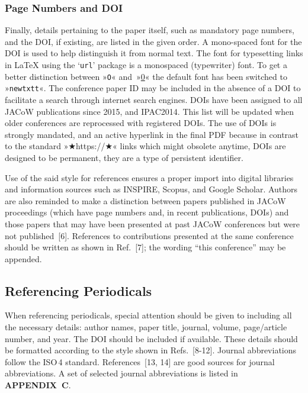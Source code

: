 \documentclass[%
               hyphens,       %
               ]{jacow}
\begin{document}
\subsubsection{Page Numbers and DOI}

Finally, details pertaining to the paper itself, such as mandatory page numbers, and the DOI, if existing, are listed in the given order. A mono-spaced font for the DOI is used to help distinguish it from normal text. The font for typesetting links in \LaTeX{} using the ‘\texttt{url}’ package 
is a monospaced (typewriter) font. To get a better distinction between »\texttt{O}« and~»\url{0}« the default font has been switched to »\texttt{newtxtt}«. The conference paper ID may be included in the absence of a DOI to facilitate a search through internet search engines. DOIs have been assigned to all JACoW publications since 2015, and IPAC2014. This list will be updated when older conferences are reprocessed with registered DOIs. The use of DOIs is strongly mandated, and an active hyperlink in the final PDF because in contrast to the standard »★https://★« links which might obsolete anytime, DOIs are designed to be permanent, they are a type of persistent identifier.

Use of the said style for references ensures a proper import into digital libraries and information sources such as INSPIRE, Scopus, and Google Scholar. Authors are also reminded to make a distinction between papers published in JACoW proceedings (which have page numbers and, in recent publications, DOIs) and those papers that may have been presented at past JACoW conferences but were not published~[6]. References to contributions presented at the same conference should be written as shown in Ref.~[7]; the wording “this conference” may be appended.

\subsection{Referencing Periodicals}

When referencing periodicals, special attention should be given to including all the necessary details: author names, paper title, journal, volume, page/article number, and year. The DOI should be included if available. These details should be formatted according to the style shown in Refs.~[8-12]. Journal abbreviations follow the ISO\,4 standard. References~[13, 14] are good sources for journal abbreviations. A set of selected journal abbreviations is listed in \textbf{APPENDIX~C}.
\end{document}
